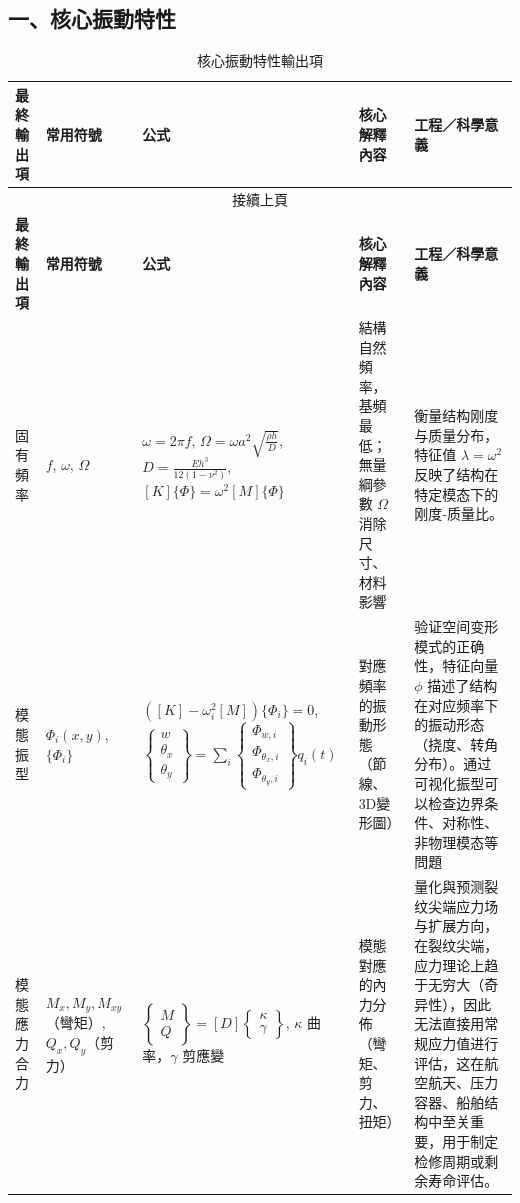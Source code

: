 \documentclass[a4paper,10pt]{article}
\begin{document}
\clearpage
\thispagestyle{empty}
\begin{landscape}
\centering
\footnotesize
\setlength{\tabcolsep}{4pt}
\renewcommand{\arraystretch}{1.15}

\subsection*{一、核心振動特性}

\begin{longtable}{p{2.2cm}p{2.2cm}p{5.5cm}p{4.5cm}p{4.5cm}}
\caption{核心振動特性輸出項} \label{tab:core_vib} \\
\toprule
\textbf{最終輸出項} & \textbf{常用符號} & \textbf{公式} & \textbf{核心解釋內容} & \textbf{工程／科學意義} \\
\midrule
\endfirsthead
\multicolumn{5}{c}{接續上頁} \\
\toprule
\textbf{最終輸出項} & \textbf{常用符號} & \textbf{公式} & \textbf{核心解釋內容} & \textbf{工程／科學意義} \\
\midrule
\endhead
\bottomrule
\endfoot
固有頻率 & $f$, $\omega$, $\Omega$ & $\omega=2\pi f$, $\Omega=\omega a^2\sqrt{\frac{\rho h}{D}}$, $D=\frac{Eh^3}{12(1-\nu^2)}$, $[K]\{\Phi\}=\omega^2[M]\{\Phi\}$ & 結構自然頻率，基頻最低；無量綱參數 $\Omega$ 消除尺寸、材料影響 & 衡量结构刚度与质量分布，特征值 $\lambda=\omega^2$反映了结构在特定模态下的刚度‑质量比。 \\
\addlinespace
模態振型 & $\Phi_i(x,y)$, $\{\Phi_i\}$ & $([K]-\omega_i^2[M])\{\Phi_i\}=0$, $\begin{Bmatrix} w\\\theta_x\\\theta_y\end{Bmatrix}=\sum_i\begin{Bmatrix} \Phi_{w,i}\\\Phi_{\theta_x,i}\\\Phi_{\theta_y,i}\end{Bmatrix}q_i(t)$ & 對應頻率的振動形態（節線、3D變形圖） & 验证空间变形模式的正确性，特征向量 ${\phi}$ 描述了结构在对应频率下的振动形态（挠度、转角分布）。通过可视化振型可以检查边界条件、对称性、非物理模态等問題 \\
\addlinespace
模態應力合力 & $M_x,M_y,M_{xy}$（彎矩）, $Q_x,Q_y$（剪力） & $\begin{Bmatrix}M\\Q\end{Bmatrix}=[D]\begin{Bmatrix}\kappa\\\gamma\end{Bmatrix}$, $\kappa$ 曲率，$\gamma$ 剪應變 & 模態對應的內力分佈（彎矩、剪力、扭矩） & 量化與预测裂纹尖端应力场与扩展方向，在裂纹尖端，应力理论上趋于无穷大（奇异性），因此无法直接用常规应力值进行评估，这在航空航天、压力容器、船舶结构中至关重要，用于制定检修周期或剩余寿命评估。 \\

\end{longtable}
\end{landscape}
\end{document}
